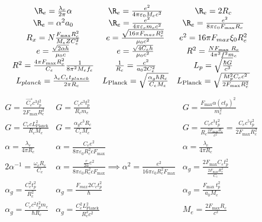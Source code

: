     \begin{gather*}
        \begin{array}{ccc}
            \R_e = \frac{\lambda_c}{2 \pi} \alpha & \R_e = \frac{e^2}{4 \pi \varepsilon_0 M_e c^2} & \R_e = 2 R_c \\
            \R_e = \alpha^2 a_0 & \R_e = \frac{e^2}{4 \pi \varepsilon_c m_c c^2} & \R_e = \frac{e^2}{8 \pi \varepsilon_0 F_{\max} R_c} \\
            R_x = N \frac{F_{\max} R_c^2}{M_e Z C_e^2} & e = \frac{\sqrt{16 \pi F_{max} R_c^2}}{\mu_0 c^2} & e^2 = 16 \pi F_{max} \xi_0 R_e^2 \\
            e = \frac{\sqrt{2 \alpha h}}{\mu_0 c} & e = \frac{\sqrt{4 C_e h}}{\mu_0 c^2} & R^2 = \frac{N F_{\text {max }} R_c}{4 \pi^2 f^2 m_e} \\
            R^2 = \frac{4 \pi F_{\max} R_c^2}{C_e} \frac{1}{8 \pi^2 M_e f_e} & \frac{1}{R_c} = \frac{c^2}{a_0 2 C_e^2} & {L_p} = \sqrt{\frac{\hbar G}{c^3}} \\
            L_{planck} = \frac{\lambda_e C_e t_{planck}}{2 \pi R_c} & L_\text{Planck} = \sqrt{\frac{\alpha_g \hbar R_c}{C_e M_e}} & L_\text{Planck} = \sqrt{\frac{\hbar t_p^2 C_e c^2}{2 F_{\max} R_c^2}} \\
        \end{array}
    \end{gather*}
\begin{gather*}
    \begin{array}{ccc}
            G = \frac{\vec{C_e} c^3 l_p^2}{2 F_{\max } R_c^2} & G = \frac{C_e c^3 t_p^2}{R_c m_e} & G = \frac{F_{\operatorname{max}} \alpha (c t_p)^2}{m_e^2} \\
            G = \frac{C_e c L_\text{Planck}^2}{R_c M_e} & G = \frac{\alpha_g c^3 R_c}{C_e M_e} & G = \frac{C_e c^3 t_p^2}{R_c \frac{2 F_{\max} R_c}{c^2}} = \frac{C_e c^5 t_p^2}{2 F_{\max} R_c^2} \\
            \alpha = \frac{\lambda_e}{4 \pi R_c} & \alpha = \frac{C_e e^2}{8 \pi \varepsilon_0 R_c^2 c F_{\max}} & \alpha = \frac{\lambda_c}{4 \pi R_c} \\
            2\alpha^{-1} = \frac{\omega_c R_c}{C_e} & \alpha = \frac{\frac{c}{2 \alpha} e^2}{8 \pi \varepsilon_0 R_c^2 c F_{\max}} \implies \alpha^2 = \frac{e^2}{16 \pi \varepsilon_0 R_c^2 F_{\max}} & \alpha_g = \frac{2F_{\max} C_e t_p^2}{\frac{2F_{\max} R_c^2}{C_e}} \\
            \alpha_g = \frac{C_e^2 t_p^2}{R_c^2} & \alpha_g = \frac{F_{max} 2 C_e t_p^2}{\hbar} & \alpha_g = \frac{F_{\text {max }} t_p^2}{a_0 M_e} \\
            \alpha_g = \frac{C_e c^2 t_p^2 m_e}{\hbar R_c} & \alpha_g = \frac{C_e^2 L_\text{Planck}^2}{R_c^2 c^2} & M_e = \frac{2 F_{\max} R_c}{c^2} \\
        \end{array}
    \end{gather*}
